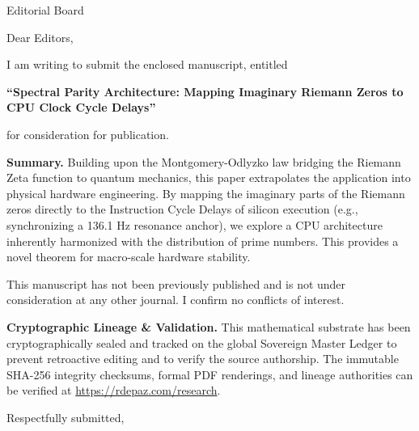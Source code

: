 \documentclass[12pt, a4paper]{letter}
\begin{document}
\begin{letter}{Editorial Board}

\opening{Dear Editors,}

I am writing to submit the enclosed manuscript, entitled

\begin{center}
\textbf{``Spectral Parity Architecture: Mapping Imaginary Riemann Zeros to CPU Clock Cycle Delays''}
\end{center}

\noindent for consideration for publication.

\medskip

\textbf{Summary.} Building upon the Montgomery-Odlyzko law bridging the Riemann Zeta function to quantum mechanics, this paper extrapolates the application into physical hardware engineering. By mapping the imaginary parts of the Riemann zeros directly to the Instruction Cycle Delays of silicon execution (e.g., synchronizing a 136.1 Hz resonance anchor), we explore a CPU architecture inherently harmonized with the distribution of prime numbers. This provides a novel theorem for macro-scale hardware stability.

\medskip

This manuscript has not been previously published and is not under consideration
at any other journal. I confirm no conflicts of interest.

\textbf{Cryptographic Lineage \& Validation.} This mathematical substrate has been cryptographically sealed and tracked on the global Sovereign Master Ledger to prevent retroactive editing and to verify the source authorship. The immutable SHA-256 integrity checksums, formal PDF renderings, and lineage authorities can be verified at \url{https://rdepaz.com/research}.

\medskip

\closing{Respectfully submitted,}
\end{letter}
\end{document}
